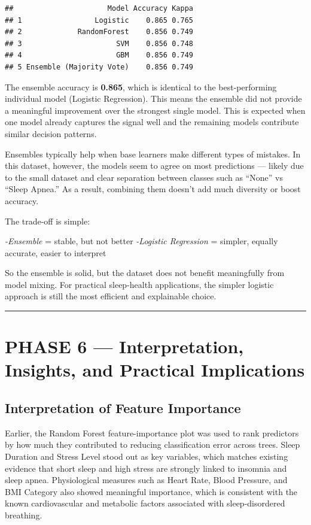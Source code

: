 \documentclass[
]{article}
\begin{document}
\begin{verbatim}
##                      Model Accuracy Kappa
## 1                 Logistic    0.865 0.765
## 2             RandomForest    0.856 0.749
## 3                      SVM    0.856 0.748
## 4                      GBM    0.856 0.749
## 5 Ensemble (Majority Vote)    0.856 0.749
\end{verbatim}

The ensemble accuracy is \textbf{0.865}, which is identical to the
best-performing individual model (Logistic Regression). This means the
ensemble did not provide a meaningful improvement over the strongest
single model. This is expected when one model already captures the
signal well and the remaining models contribute similar decision
patterns.

Ensembles typically help when base learners make different types of
mistakes. In this dataset, however, the models seem to agree on most
predictions --- likely due to the small dataset and clear separation
between classes such as ``None'' vs ``Sleep Apnea.'' As a result,
combining them doesn't add much diversity or boost accuracy.

The trade-off is simple:

\emph{-Ensemble} = stable, but not better \emph{-Logistic Regression} =
simpler, equally accurate, easier to interpret

So the ensemble is solid, but the dataset does not benefit meaningfully
from model mixing. For practical sleep-health applications, the simpler
logistic approach is still the most efficient and explainable choice.

\begin{center}\rule{0.5\linewidth}{0.5pt}\end{center}

\section{\texorpdfstring{\textbf{PHASE 6 --- Interpretation, Insights,
and Practical
Implications}}{PHASE 6 --- Interpretation, Insights, and Practical Implications}}\label{phase-6-interpretation-insights-and-practical-implications}

\subsection{Interpretation of Feature
Importance}\label{interpretation-of-feature-importance}

Earlier, the Random Forest feature-importance plot was used to rank
predictors by how much they contributed to reducing classification error
across trees. Sleep Duration and Stress Level stood out as key
variables, which matches existing evidence that short sleep and high
stress are strongly linked to insomnia and sleep apnea. Physiological
measures such as Heart Rate, Blood Pressure, and BMI Category also
showed meaningful importance, which is consistent with the known
cardiovascular and metabolic factors associated with sleep-disordered
breathing.
\end{document}
